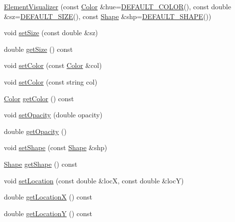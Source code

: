 \begin{DoxyCompactItemize}
\item 
\mbox{\hyperlink{classbridges_1_1_element_visualizer_addcc19a2f7fd51dcc7aebfdabb882886}{Element\+Visualizer}} (const \mbox{\hyperlink{classbridges_1_1_color}{Color}} \&hue=\mbox{\hyperlink{classbridges_1_1_element_visualizer_af86eb415ef765943472952ba49f7163d}{D\+E\+F\+A\+U\+L\+T\+\_\+\+C\+O\+L\+OR}}(), const double \&sz=\mbox{\hyperlink{classbridges_1_1_element_visualizer_a3e21ee8df1c6c3f22a8c631894344413}{D\+E\+F\+A\+U\+L\+T\+\_\+\+S\+I\+ZE}}(), const \mbox{\hyperlink{namespacebridges_a1b4050586bd708782ae0d4f3b06b9579}{Shape}} \&shp=\mbox{\hyperlink{classbridges_1_1_element_visualizer_a79c6eef0e43bdd61b9292053dfe45f29}{D\+E\+F\+A\+U\+L\+T\+\_\+\+S\+H\+A\+PE}}())
\item 
void \mbox{\hyperlink{classbridges_1_1_element_visualizer_a6fc924e754008992b310a89d8d88fce9}{set\+Size}} (const double \&sz)
\item 
double \mbox{\hyperlink{classbridges_1_1_element_visualizer_a3a1ab72360099d615ad582e5780143ad}{get\+Size}} () const
\item 
void \mbox{\hyperlink{classbridges_1_1_element_visualizer_af14723066e52c159eebfb804d65dd825}{set\+Color}} (const \mbox{\hyperlink{classbridges_1_1_color}{Color}} \&col)
\item 
void \mbox{\hyperlink{classbridges_1_1_element_visualizer_a7a0c8b8ce505265dcf622f2a884fac81}{set\+Color}} (const string col)
\item 
\mbox{\hyperlink{classbridges_1_1_color}{Color}} \mbox{\hyperlink{classbridges_1_1_element_visualizer_a947aaebce11064225027182da9dbcea3}{get\+Color}} () const
\item 
void \mbox{\hyperlink{classbridges_1_1_element_visualizer_a8f77db4a2774021aec4ab8ea18e50fc9}{set\+Opacity}} (double opacity)
\item 
double \mbox{\hyperlink{classbridges_1_1_element_visualizer_ae806977ebc8ff1c5bce81c90b31902b5}{get\+Opacity}} ()
\item 
void \mbox{\hyperlink{classbridges_1_1_element_visualizer_af81cc20423f2fedffa81fb7c473a1179}{set\+Shape}} (const \mbox{\hyperlink{namespacebridges_a1b4050586bd708782ae0d4f3b06b9579}{Shape}} \&shp)
\item 
\mbox{\hyperlink{namespacebridges_a1b4050586bd708782ae0d4f3b06b9579}{Shape}} \mbox{\hyperlink{classbridges_1_1_element_visualizer_a2348ed705c5c6f85082e2aff11d439e7}{get\+Shape}} () const
\item 
void \mbox{\hyperlink{classbridges_1_1_element_visualizer_ad06f2fd509f6b3474feeb4fa1fef38d5}{set\+Location}} (const double \&locX, const double \&locY)
\item 
double \mbox{\hyperlink{classbridges_1_1_element_visualizer_ac944b8fb1b5b27454cf04145cb711ccc}{get\+LocationX}} () const
\item 
double \mbox{\hyperlink{classbridges_1_1_element_visualizer_a0c17d12888f98e710ed0d5ab6e142f8e}{get\+LocationY}} () const
\end{DoxyCompactItemize}
